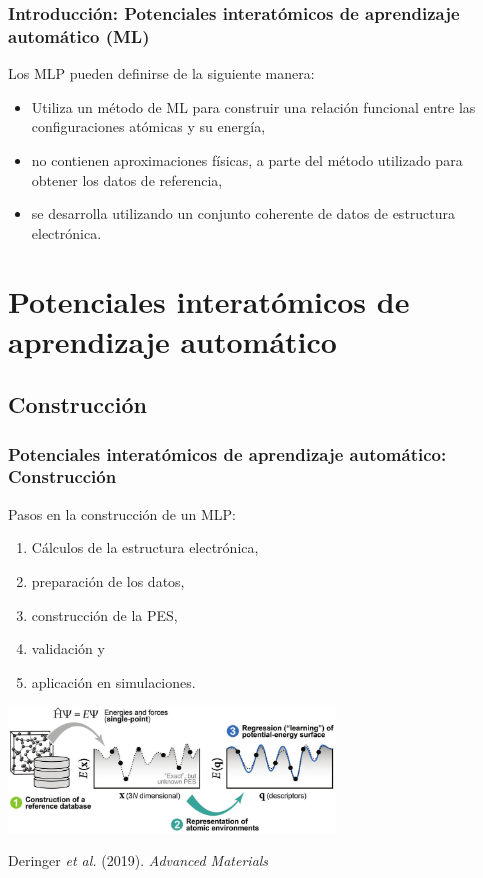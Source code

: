 \documentclass[aspectratio=169]{beamer}
\begin{document}
    \begin{frame}
        \frametitle{Introducción: Potenciales interatómicos de aprendizaje 
        automático (ML)}

        Los MLP pueden definirse de la siguiente manera:
        \begin{itemize}
            \item Utiliza un método de ML para construir una relación funcional
                entre las configuraciones atómicas y su energía,
            \item no contienen aproximaciones físicas, a parte del método 
                utilizado para obtener los datos de referencia,
            \item se desarrolla utilizando un conjunto coherente de datos de
                estructura electrónica.
        \end{itemize}

    \end{frame}

    \section{Potenciales interatómicos de aprendizaje automático}

    \subsection{Construcción}

    \begin{frame}
        \frametitle{Potenciales interatómicos de aprendizaje automático: Construcción}

        Pasos en la construcción de un MLP:
        \begin{enumerate}
            \item Cálculos de la estructura electrónica,
            \item preparación de los datos,
            \item construcción de la PES,
            \item validación y
            \item aplicación en simulaciones.
        \end{enumerate}

        \begin{center}
            \includegraphics[width=0.65\textwidth]{intro-construccion.png}

            \tiny{Deringer \textit{et al.} (2019). \textit{Advanced Materials}}
        \end{center}

	\end{frame}
    
\end{document}

